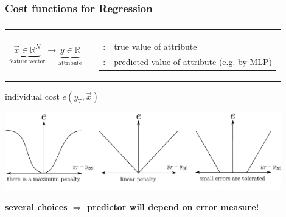 \subsubsection{Cost functions for Regression}

\begin{frame}\frametitle{\subsecname}


  \begin{tabular}{c c c}
    \parbox{4cm}{
      \[ \underbrace{\vec{x}
          \in \mathbb{R}^N
      }_{\text{feature vector}}
      \longrightarrow 
      \underbrace{y
      \in \mathbb{R}
      }_{\text{attribute}}
      \]}
    & & 
    \parbox{8cm}{\footnotesize
      \begin{tabular}{l l}
	$y_T$: & true value of attribute \\
	$y(\vec{x})$: & predicted value of attribute (e.g. by MLP)
      \end{tabular}
    }
  \end{tabular}
     \pause

  \begin{block}{individual cost $e(y_T, \vec{x})$}
    \begin{center} \includegraphics[width=12cm]{img/section1_fig17_v2.pdf} \end{center}
  \end{block}   %
  \textbf{several choices $\Rightarrow$  predictor will depend on error measure!}

\end{frame}
